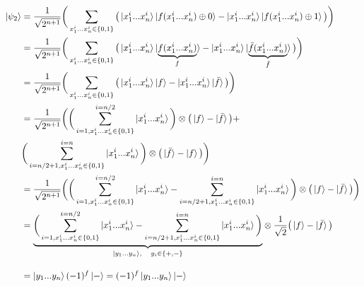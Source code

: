 \documentclass{article}
\begin{document}
\begin{align*}
   \ket{\psi_{2}} &= \frac{1}{\sqrt{2^{n+1}}}\bigg(\sum_{x^{i}_{1}...x^{i}_{n} \in \{0,1\}} \big( \ket{x^{i}_{1}...x^{i}_{n}}\ket{f(x^{i}_{1}...x^{i}_{n})\oplus0} - \ket{x^{i}_{1}...x^{i}_{n}}\ket{f(x^{i}_{1}...x^{i}_{n})\oplus1} \big) \bigg) \\
   &= \frac{1}{\sqrt{2^{n+1}}}\bigg(\sum_{x^{i}_{1}...x^{i}_{n} \in \{0,1\}} \big( \ket{x^{i}_{1}...x^{i}_{n}}\ket{\underset{f}{\underbrace{f(x^{i}_{1}...x^{i}_{n})}}} - \ket{x^{i}_{1}...x^{i}_{n}}\ket{\underset{\bar{f}}{\underbrace{\bar{f}(x^{i}_{1}...x^{i}_{n})}}} \big) \bigg) \\
   &= \frac{1}{\sqrt{2^{n+1}}}\bigg(\sum_{x^{i}_{1}...x^{i}_{n} \in \{0,1\}} \big( \ket{x^{i}_{1}...x^{i}_{n}}\ket{f} - \ket{x^{i}_{1}...x^{i}_{n}}\ket{\bar{f}} \big) \bigg) \\
   &= \frac{1}{\sqrt{2^{n+1}}}\bigg(\bigg(\sum^{i=n/2}_{i=1,x^{i}_{1}...x^{i}_{n} \in \{0,1\}} \ket{x^{i}_{1}...x^{i}_{n}}\bigg)\otimes\big(\ket{f}-\ket{\bar{f}}\big) + \\&\bigg(\sum^{i=n}_{i=n/2+1,x^{i}_{1}...x^{i}_{n} \in \{0,1\}} \ket{x^{i}_{1}...x^{i}_{n}}\bigg)\otimes\big(\ket{\bar{f}}-\ket{f}\big) \bigg) \\
   &= \frac{1}{\sqrt{2^{n+1}}}\bigg(\bigg(\sum^{i=n/2}_{i=1,x^{i}_{1}...x^{i}_{n} \in \{0,1\}} \ket{x^{i}_{1}...x^{i}_{n}} - \sum^{i=n}_{i=n/2+1,x^{i}_{1}...x^{i}_{n} \in \{0,1\}} \ket{x^{i}_{1}...x^{i}_{n}}\bigg)\otimes\big(\ket{f}-\ket{\bar{f}}\big)\bigg) \\
   &= \underset{\ket{y_{1}...y_{n}}, \quad y_{i} \in \{+,-\}}{\underbrace{\bigg(\sum^{i=n/2}_{i=1,x^{i}_{1}...x^{i}_{n} \in \{0,1\}} \ket{x^{i}_{1}...x^{i}_{n}} - \sum^{i=n}_{i=n/2+1,x^{i}_{1}...x^{i}_{n} \in \{0,1\}} \ket{x^{i}_{1}...x^{i}_{n}}\bigg)}} \otimes \frac{1}{\sqrt{2}} \big(\ket{f}-\ket{\bar{f}}\big) \\[1em]&= \ket{y_{1}...y_{n}}(-1)^{f}\ket{-} = (-1)^{f}\ket{y_{1}...y_{n}}\ket{-}   
\end{align*}
\end{document}

